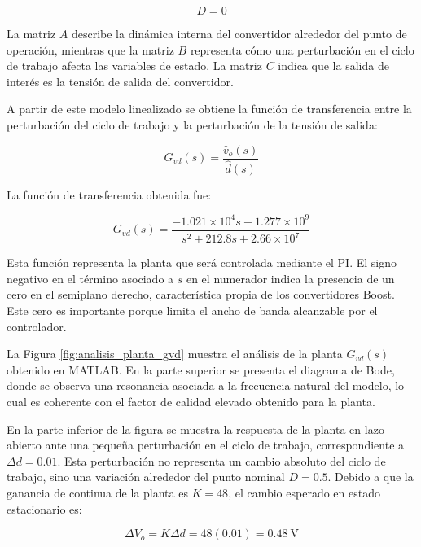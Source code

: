 \documentclass[conference]{IEEEtran}
\begin{document}
\begin{equation}
D = 0
\end{equation}

La matriz $A$ describe la dinámica interna del convertidor alrededor del punto de operación, mientras que la matriz $B$ representa cómo una perturbación en el ciclo de trabajo afecta las variables de estado. La matriz $C$ indica que la salida de interés es la tensión de salida del convertidor.

A partir de este modelo linealizado se obtiene la función de transferencia entre la perturbación del ciclo de trabajo y la perturbación de la tensión de salida:

\begin{equation}
    G_{vd}(s)=
    \frac{\hat{v}_o(s)}{\hat{d}(s)}
\end{equation}

La función de transferencia obtenida fue:

\begin{equation}
    G_{vd}(s)=
    \frac{-1.021\times10^4s+1.277\times10^9}
    {s^2+212.8s+2.66\times10^7}
    \label{eq:gvd_obtenida}
\end{equation}

Esta función representa la planta que será controlada mediante el PI. El signo negativo en el término asociado a $s$ en el numerador indica la presencia de un cero en el semiplano derecho, característica propia de los convertidores Boost. Este cero es importante porque limita el ancho de banda alcanzable por el controlador.

La Figura \ref{fig:analisis_planta_gvd} muestra el análisis de la planta $G_{vd}(s)$ obtenido en MATLAB. En la parte superior se presenta el diagrama de Bode, donde se observa una resonancia asociada a la frecuencia natural del modelo, lo cual es coherente con el factor de calidad elevado obtenido para la planta.

En la parte inferior de la figura se muestra la respuesta de la planta en lazo abierto ante una pequeña perturbación en el ciclo de trabajo, correspondiente a $\Delta d=0.01$. Esta perturbación no representa un cambio absoluto del ciclo de trabajo, sino una variación alrededor del punto nominal $D=0.5$. Debido a que la ganancia de continua de la planta es $K=48$, el cambio esperado en estado estacionario es:

\begin{equation}
    \Delta V_o = K\Delta d = 48(0.01)=0.48~\mathrm{V}
\end{equation}
\end{document}
